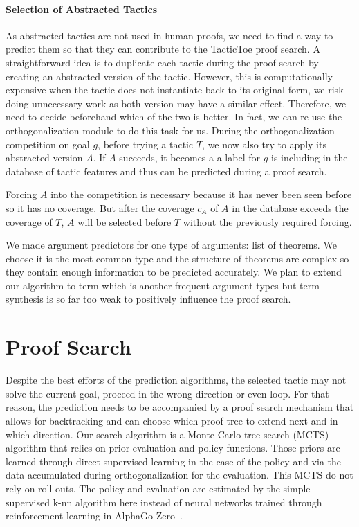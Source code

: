 \documentclass[runningheads,a4paper,draft]{svjour3}
\def\tactictoe{\textsf{TacticToe}\xspace}
\begin{document}
\paragraph{Selection of Abstracted Tactics}
As abstracted tactics are not used in human proofs, we need to find a way to 
predict them so that they can contribute to the \tactictoe proof search.
A straightforward idea is to duplicate each tactic during the proof search by 
creating an abstracted version of the tactic. However, this is computationally 
expensive when the tactic does not instantiate back to its original form, we 
risk doing unnecessary work as both version may have a similar effect.
Therefore, we need to decide beforehand which of the two is better.
In fact, we can re-use the orthogonalization module to do this task for us.
During the orthogonalization competition on goal $g$, before trying a tactic 
$T$, we now also try to apply its abstracted version $A$. If $A$ succeeds, it 
becomes a a label for $g$ is including in the database of tactic features and 
thus can be predicted during a proof search.

\begin{remark}
Forcing $A$ into the competition is necessary because it has never been seen 
before so it has no coverage. But after the coverage $c_A$ of $A$ in the 
database exceeds the coverage of $T$, $A$ will be selected before $T$ without 
the 
previously required forcing.
\end{remark}

We made argument predictors for one type of arguments: list 
of theorems. We choose it is the most common type and the structure of theorems 
are complex so they contain enough information to be predicted accurately. 
We plan to extend our algorithm to term which is another frequent argument 
types but term synthesis is so far too weak to positively 
influence the proof search.


\section{Proof Search}\label{sec:proofsearch}

Despite the best efforts of the prediction algorithms, the selected tactic may 
not solve the current goal, proceed in the wrong direction
or even loop. For that reason, the prediction needs to be accompanied by a  
proof search mechanism that allows for backtracking and 
can choose which proof tree to extend next and in which direction.
Our search algorithm is a Monte Carlo tree search (MCTS) algorithm that relies 
on prior evaluation and policy functions. Those priors are learned through 
direct supervised learning in the case of the policy and via the data 
accumulated during orthogonalization for the evaluation. This MCTS do not rely 
on roll outs. The 
policy and evaluation are estimated by the simple supervised k-nn algorithm 
here instead of neural networks trained through reinforcement learning in 
AlphaGo Zero~\cite{}. 
\end{document}
